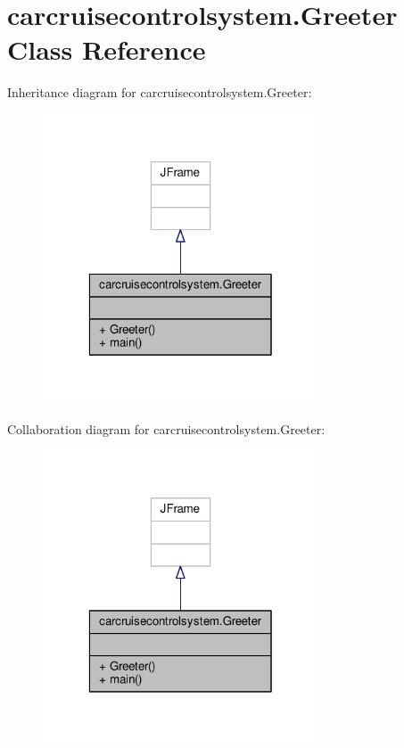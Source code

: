 \hypertarget{classcarcruisecontrolsystem_1_1Greeter}{\section{carcruisecontrolsystem.\-Greeter Class Reference}
\label{classcarcruisecontrolsystem_1_1Greeter}
}


Inheritance diagram for carcruisecontrolsystem.\-Greeter\-:
\nopagebreak
\begin{figure}[H]
\begin{center}
\leavevmode
\includegraphics[width=232pt]{classcarcruisecontrolsystem_1_1Greeter__inherit__graph}
\end{center}
\end{figure}


Collaboration diagram for carcruisecontrolsystem.\-Greeter\-:
\nopagebreak
\begin{figure}[H]
\begin{center}
\leavevmode
\includegraphics[width=232pt]{classcarcruisecontrolsystem_1_1Greeter__coll__graph}
\end{center}
\end{figure}
